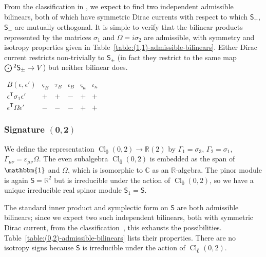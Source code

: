 \documentclass[10pt,a4paper]{amsart}
\numberwithin{equation}{section}
\newcommand{\RR}{\mathbb{R}}
\newcommand{\CC}{\mathbb{C}}
\newcommand{\ssS}{\mathsf{S}}
\newcommand{\Odot}{\mathchoice{{\textstyle\bigodot}}{\bigodot}{\bigodot}{\bigodot}}
\newcommand{\1}{\mathbbm{1}}
\DeclareMathOperator{\Cl}{Cl}
\begin{document}
From the classification in \cite{Alekseevsky1997}, we expect to find two independent admissible bilinears, both of which have symmetric Dirac currents with respect to which $\ssS_+$, $\ssS_-$ are mutually orthogonal. It is simple to verify that the bilinear products represented by the matrices $\sigma_1$ and $\Omega=i\sigma_2$ are admissible, with symmetry and isotropy properties given in Table~\ref{table:(1,1)-admissible-bilinears}. Either Dirac current restricts non-trivially to $\ssS_\pm$ (in fact they restrict to the same map $\Odot^2\ssS_\pm\to V$) but neither bilinear does.

\begin{table}[t]
\centering
	\caption{Properties of admissible bilinears and their Dirac currents in signature $(1,1)$.}
	\label{table:(1,1)-admissible-bilinears}
	\setlength{\extrarowheight}{.75ex}
	$\begin{array}{c|ccccc}
		B(\epsilon,\epsilon')	& \varsigma_B & \tau_B	& \iota_B & \varsigma_\kappa & \iota_\kappa	\\
		\hline
		\epsilon^{\mathsf{T}}\sigma_1\epsilon'	& +	& + & - & + & +	\\
		\epsilon^{\mathsf{T}}\Omega\epsilon'	& -	& - & - & + & +
	\end{array}$
\end{table}

\subsubsection[Signature (0,2)]{Signature $\boldsymbol{(0,2)}$}

We define the representation $\Cl_{\bar 0}(0,2)\to \RR(2)$ by
$\Gamma_1 = \sigma_3$,
$\Gamma_2 = \sigma_1$,
$\Gamma_{\mu\nu} = \varepsilon_{\mu\nu}\Omega$.
The even subalgebra $\Cl_{\bar 0}(0,2)$ is embedded as the span of $\1$ and $\Omega$, which is isomorphic to $\CC$ as an $\RR$-algebra. The pinor module is again $\ssS=\RR^2$ but is irreducible under the action of $\Cl_{\overline 0}(0,2)$, so we have a unique irreducible real spinor module $\ssS_1=\ssS$.

The standard inner product and symplectic form on $\ssS$ are both admissible bilinears; since we expect two such independent bilinears, both with symmetric Dirac current, from the classification~\cite{Alekseevsky1997}, this exhausts the possibilities. Table~\ref{table:(0,2)-admissible-bilinears} lists their properties. There are no isotropy signs because $\ssS$ is irreducible under the action of $\Cl_{\overline 0}(0,2)$.
\end{document}

